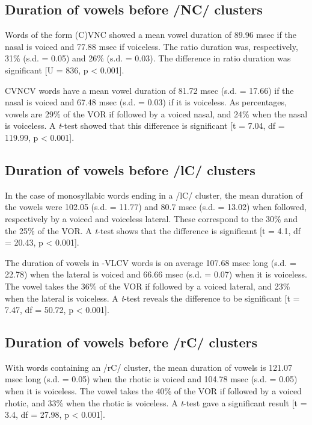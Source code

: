 \documentclass[11pt,a4paper,oneside,openany]{memoir}\usepackage[]{graphicx}\usepackage[]{color}
\begin{document}
\subsection{Duration of vowels before /NC/ clusters}


Words of the form (C)VNC showed a mean vowel duration of 89.96 msec if the nasal is voiced and 77.88 msec if voiceless.
The ratio duration was, respectively, 31\% (s.d. = 0.05) and 26\% (s.d. = 0.03).
The difference in ratio duration was significant [U = 836, p < 0.001].



CVNCV words have a mean vowel duration of 81.72 msec (s.d. = 17.66) if the nasal is voiced and 67.48 msec  (s.d. = 0.03) if it is voiceless.
As percentages, vowels are 29\% of the VOR if followed by a voiced nasal, and 24\% when the nasal is voiceless.
A \textit{t}-test showed that this difference is significant [t = 7.04, df = 119.99, p < 0.001].


\subsection{Duration of vowels before /lC/ clusters}


In the case of monosyllabic words ending in a /lC/ cluster, the mean duration of the vowels were 102.05 (s.d. = 11.77) and 80.7 msec (s.d. = 13.02) when followed, respectively by a voiced and voiceless lateral.
These correspond to the 30\% and the 25\% of the VOR.
A \textit{t}-test shows that the difference is significant [t = 4.1, df = 20.43, p < 0.001].




The duration of vowels in -VLCV words is on average 107.68 msec long (s.d. = 22.78) when the lateral is voiced and 66.66 msec (s.d. = 0.07) when it is voiceless.
The vowel takes the 36\% of the VOR if followed by a voiced lateral, and 23\% when the lateral is voiceless.
A \textit{t}-test reveals the difference to be significant [t = 7.47, df = 50.72, p < 0.001].

\subsection{Duration of vowels before /rC/ clusters}



With words containing an /rC/ cluster, the mean duration of vowels is 121.07 msec long (s.d. = 0.05) when the rhotic is voiced and 104.78 msec (s.d. = 0.05) when it is voiceless.
The vowel takes the 40\% of the VOR if followed by a voiced rhotic, and 33\% when the rhotic is voiceless.
A \textit{t}-test gave a significant result [t = 3.4, df = 27.98, p < 0.001].
\end{document}
